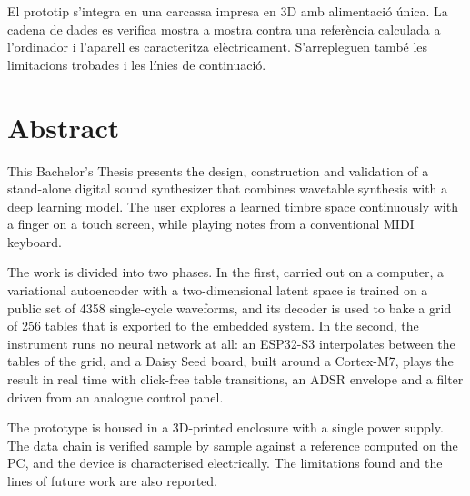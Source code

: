 \documentclass[11pt,spanish,a4paper,hidelinks]{book}
\begin{document}
El prototip s'integra en una carcassa impresa en 3D amb alimentació única. La
cadena de dades es verifica mostra a mostra contra una referència calculada a
l'ordinador i l'aparell es caracteritza elèctricament. S'arrepleguen també les
limitacions trobades i les línies de continuació.


\section*{Abstract}
\noindent This Bachelor's Thesis presents the design, construction and
validation of a stand-alone digital sound synthesizer that combines wavetable
synthesis with a deep learning model. The user explores a learned timbre space
continuously with a finger on a touch screen, while playing notes from a
conventional MIDI keyboard.

The work is divided into two phases. In the first, carried out on a computer, a
variational autoencoder with a two-dimensional latent space is trained on a
public set of 4358 single-cycle waveforms, and its decoder is used to bake a grid
of 256 tables that is exported to the embedded system. In the second, the
instrument runs no neural network at all: an ESP32-S3 interpolates between the
tables of the grid, and a Daisy Seed board, built around a Cortex-M7, plays the
result in real time with click-free table transitions, an ADSR envelope and a
filter driven from an analogue control panel.

The prototype is housed in a 3D-printed enclosure with a single power supply.
The data chain is verified sample by sample against a reference computed on the
PC, and the device is characterised electrically. The limitations found and the
lines of future work are also reported.

\newpage
\def\comentarioRESUMEN{%
    \\[2mm] 
    \textcolor{red}{Esta página debe eliminarse para el TFG del GMAT}: 
    puedes hacerlo con \texttt{\textbackslash setboolean\{GMAT\}\{false\}}
    \\[2mm]}
\def\comentarioRESUMEN{\\[2mm]} %
\end{document}
